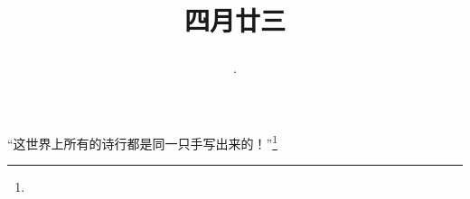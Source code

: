 \title{\date[d=30,m=5,y=2024][year:cn-y,年,month:cn,day:cn,日,·,weekday]·四月廿三 }
“这世界上所有的诗行都是同一只手写出来的！”\footnote{ }

